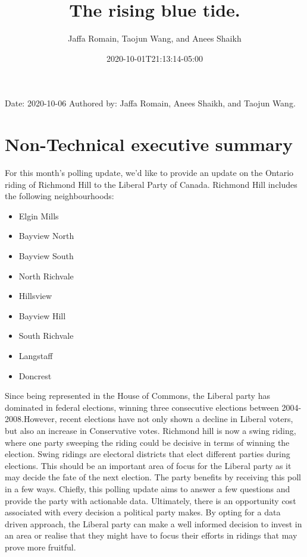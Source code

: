 \documentclass[
]{article}
\title{The rising blue tide.}
\author{Jaffa Romain, Taojun Wang, and Anees Shaikh}
\date{2020-10-01T21:13:14-05:00}
\providecommand{\tightlist}{%
  \setlength{\itemsep}{0pt}\setlength{\parskip}{0pt}}
\begin{document}
\maketitle

Date: 2020-10-06 Authored by: Jaffa Romain, Anees Shaikh, and Taojun
Wang.

\hypertarget{non-technical-executive-summary}{%
\section{Non-Technical executive
summary}\label{non-technical-executive-summary}}

For this month's polling update, we'd like to provide an update on the
Ontario riding of Richmond Hill to the Liberal Party of Canada. Richmond
Hill includes the following neighbourhoods:

\begin{itemize}
\tightlist
\item
  Elgin Mills
\item
  Bayview North
\item
  Bayview South
\item
  North Richvale
\item
  Hillsview
\item
  Bayview Hill
\item
  South Richvale
\item
  Langstaff
\item
  Doncrest
\end{itemize}

Since being represented in the House of Commons, the Liberal party has
dominated in federal elections, winning three consecutive elections
between 2004-2008.However, recent elections have not only shown a
decline in Liberal voters, but also an increase in Conservative votes.
Richmond hill is now a swing riding, where one party sweeping the riding
could be decisive in terms of winning the election. Swing ridings are
electoral districts that elect different parties during elections. This
should be an important area of focus for the Liberal party as it may
decide the fate of the next election. The party benefits by receiving
this poll in a few ways. Chiefly, this polling update aims to answer a
few questions and provide the party with actionable data. Ultimately,
there is an opportunity cost associated with every decision a political
party makes. By opting for a data driven approach, the Liberal party can
make a well informed decision to invest in an area or realise that they
might have to focus their efforts in ridings that may prove more
fruitful.
\end{document}
